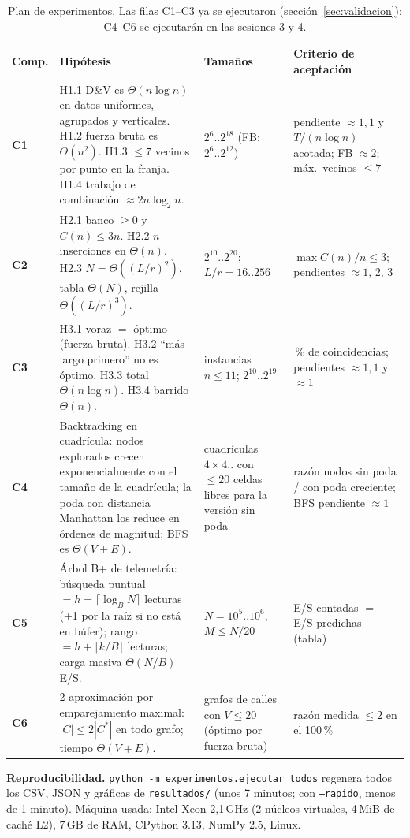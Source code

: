 \documentclass[11pt,letterpaper]{article}
\theoremstyle{plain}
\theoremstyle{definition}
\newcommand{\Th}{\Theta}
\begin{document}
\begin{table}[H]
\centering\small
\caption{Plan de experimentos. Las filas C1--C3 ya se ejecutaron (sección~\ref{sec:validacion});
C4--C6 se ejecutarán en las sesiones 3 y 4.}
\label{tab:plan}
\begin{tabularx}{\linewidth}{>{\bfseries}p{1.25cm} X >{\raggedright\arraybackslash}p{2.5cm} >{\raggedright\arraybackslash}p{3.3cm}}
\toprule
Comp. & Hipótesis & Tamaños & Criterio de aceptación \\
\midrule
C1 & H1.1 D\&V es $\Th(n\log n)$ en datos uniformes, agrupados y verticales. H1.2 fuerza bruta es
$\Th(n^2)$. H1.3 $\le7$ vecinos por punto en la franja. H1.4 trabajo de combinación $\approx 2n\log_2 n$. &
$2^6..2^{18}$ (FB: $2^6..2^{12}$) & pendiente $\approx1{,}1$ y $T/(n\log n)$ acotada; FB $\approx2$; máx.\ vecinos $\le7$ \\
C2 & H2.1 banco $\ge0$ y $C(n)\le3n$. H2.2 $n$ inserciones en $\Th(n)$. H2.3 $N=\Th((L/r)^2)$, tabla $\Th(N)$,
rejilla $\Th((L/r)^3)$. & $2^{10}..2^{20}$; $L/r=16..256$ & $\max C(n)/n\le3$; pendientes $\approx1$, $2$, $3$ \\
C3 & H3.1 voraz $=$ óptimo (fuerza bruta). H3.2 ``más largo primero'' no es óptimo. H3.3 total
$\Th(n\log n)$. H3.4 barrido $\Th(n)$. & 2000 instancias $n\le11$; $2^{10}..2^{19}$ & 100\,\% de
coincidencias; pendientes $\approx1{,}1$ y $\approx1$ \\
\midrule
C4 & Backtracking en cuadrícula: nodos explorados crecen exponencialmente con el tamaño de la
cuadrícula; la poda con distancia Manhattan los reduce en órdenes de magnitud; BFS es $\Th(V+E)$. &
cuadrículas $4\times4..$ con $\le 20$ celdas libres para la versión sin poda & razón nodos sin poda /
con poda creciente; BFS pendiente $\approx1$ \\
C5 & Árbol B+ de telemetría: búsqueda puntual $=h=\lceil\log_{B}N\rceil$ lecturas (+1 por la
raíz si no está en búfer); rango $=h+\lceil k/B\rceil$ lecturas; carga masiva $\Th(N/B)$ E/S. &
$N=10^5..10^6$, $M\le N/20$ & E/S contadas $=$ E/S predichas (tabla) \\
C6 & 2-aproximación por emparejamiento maximal: $|C|\le2|C^*|$ en todo grafo; tiempo $\Th(V+E)$. &
grafos de calles con $V\le20$ (óptimo por fuerza bruta) & razón medida $\le2$ en el 100\,\% \\
\bottomrule
\end{tabularx}
\end{table}

\textbf{Reproducibilidad.} \texttt{python -m experimentos.ejecutar\_todos} regenera todos los CSV,
JSON y gráficas de \texttt{resultados/} (unos 7 minutos; con \texttt{--rapido}, menos de 1 minuto).
Máquina usada: Intel Xeon 2,1\,GHz (2 núcleos virtuales, 4\,MiB de caché L2), 7\,GB de RAM, CPython
3.13, NumPy 2.5, Linux.
\end{document}
